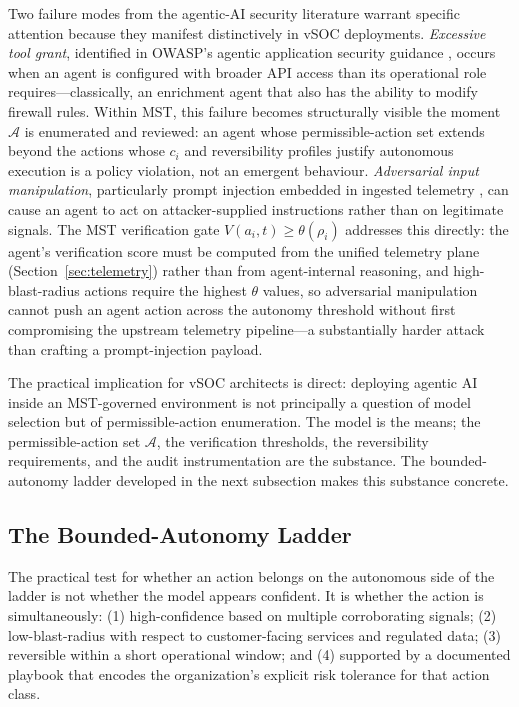 \documentclass[acmlarge]{acmart}
\begin{document}
Two failure modes from the agentic-AI security literature warrant specific
attention because they manifest distinctively in vSOC deployments.
\textit{Excessive tool grant}, identified in OWASP's agentic application
security guidance \cite{owasp2025}, occurs when an agent is configured with
broader API access than its operational role requires---classically, an
enrichment agent that also has the ability to modify firewall rules. Within
MST, this failure becomes structurally visible the moment $\mathcal{A}$ is
enumerated and reviewed: an agent whose permissible-action set extends
beyond the actions whose $c_i$ and reversibility profiles justify
autonomous execution is a policy violation, not an emergent behaviour.
\textit{Adversarial input manipulation}, particularly prompt injection
embedded in ingested telemetry \cite{papernot2016,weidinger2022}, can cause
an agent to act on attacker-supplied instructions rather than on legitimate
signals. The MST verification gate $V(a_i, t) \geq \theta(\rho_i)$
addresses this directly: the agent's verification score must be computed
from the unified telemetry plane (Section~\ref{sec:telemetry}) rather than
from agent-internal reasoning, and high-blast-radius actions require the
highest $\theta$ values, so adversarial manipulation cannot push an agent
action across the autonomy threshold without first compromising the
upstream telemetry pipeline---a substantially harder attack than crafting
a prompt-injection payload.

The practical implication for vSOC architects is direct: deploying agentic
AI inside an MST-governed environment is not principally a question of
model selection but of permissible-action enumeration. The model is the
means; the permissible-action set $\mathcal{A}$, the verification
thresholds, the reversibility requirements, and the audit instrumentation
are the substance. The bounded-autonomy ladder developed in the next
subsection makes this substance concrete.

\subsection{The Bounded-Autonomy Ladder}

The practical test for whether an action belongs on the autonomous side of the ladder
is not whether the model appears confident. It is whether the action is simultaneously:
(1) high-confidence based on multiple corroborating signals; (2) low-blast-radius
with respect to customer-facing services and regulated data; (3) reversible within a
short operational window; and (4) supported by a documented playbook that encodes the
organization's explicit risk tolerance for that action class.
\end{document}
